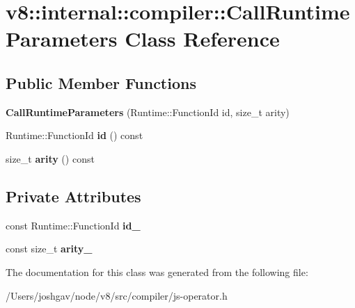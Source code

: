 \hypertarget{classv8_1_1internal_1_1compiler_1_1_call_runtime_parameters}{}\section{v8\+:\+:internal\+:\+:compiler\+:\+:Call\+Runtime\+Parameters Class Reference}
\label{classv8_1_1internal_1_1compiler_1_1_call_runtime_parameters}
\subsection*{Public Member Functions}
\begin{DoxyCompactItemize}
\item 
{\bfseries Call\+Runtime\+Parameters} (Runtime\+::\+Function\+Id id, size\+\_\+t arity)\hypertarget{classv8_1_1internal_1_1compiler_1_1_call_runtime_parameters_a9fe116c73bb5e6bb8e944e494335cd8e}{}\label{classv8_1_1internal_1_1compiler_1_1_call_runtime_parameters_a9fe116c73bb5e6bb8e944e494335cd8e}

\item 
Runtime\+::\+Function\+Id {\bfseries id} () const \hypertarget{classv8_1_1internal_1_1compiler_1_1_call_runtime_parameters_ae33872ec8275a45559a86dbe83f9425e}{}\label{classv8_1_1internal_1_1compiler_1_1_call_runtime_parameters_ae33872ec8275a45559a86dbe83f9425e}

\item 
size\+\_\+t {\bfseries arity} () const \hypertarget{classv8_1_1internal_1_1compiler_1_1_call_runtime_parameters_a9a0c676cb366d1eb0c6c03f93473d3eb}{}\label{classv8_1_1internal_1_1compiler_1_1_call_runtime_parameters_a9a0c676cb366d1eb0c6c03f93473d3eb}

\end{DoxyCompactItemize}
\subsection*{Private Attributes}
\begin{DoxyCompactItemize}
\item 
const Runtime\+::\+Function\+Id {\bfseries id\+\_\+}\hypertarget{classv8_1_1internal_1_1compiler_1_1_call_runtime_parameters_ae39c38edea2e6995efaa53f7714a49be}{}\label{classv8_1_1internal_1_1compiler_1_1_call_runtime_parameters_ae39c38edea2e6995efaa53f7714a49be}

\item 
const size\+\_\+t {\bfseries arity\+\_\+}\hypertarget{classv8_1_1internal_1_1compiler_1_1_call_runtime_parameters_a3adb1eec2de43c8768a3db0ea240f522}{}\label{classv8_1_1internal_1_1compiler_1_1_call_runtime_parameters_a3adb1eec2de43c8768a3db0ea240f522}

\end{DoxyCompactItemize}


The documentation for this class was generated from the following file\+:\begin{DoxyCompactItemize}
\item 
/\+Users/joshgav/node/v8/src/compiler/js-\/operator.\+h\end{DoxyCompactItemize}
